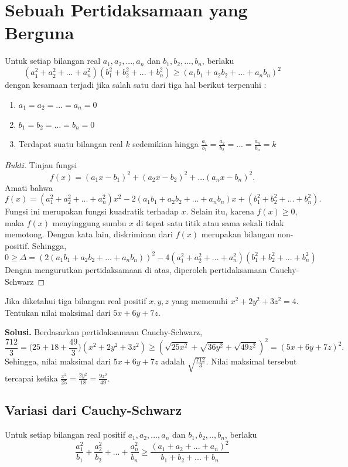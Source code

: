 \documentclass[11pt]{scrartcl}
\begin{document}
\section{Sebuah Pertidaksamaan yang Berguna}
\begin{theorem}
 Untuk setiap bilangan real $a_1,a_2,...,a_n$ dan $b_1,b_2,...,b_n$, berlaku $$(a_1^2 + a_2^2 + ... + a_n^2)(b_1^2 + b_2^2 +... + b_n^2) \geq (a_1b_1 + a_2b_2 + ... + a_nb_n)^2$$ dengan kesamaan terjadi jika salah satu dari tiga hal berikut terpenuhi : 
        \begin{enumerate}
            \item $a_1 = a_2 = ... = a_n = 0$
            \item $b_1 = b_2 = ... = b_n = 0$
            \item Terdapat suatu bilangan real $k$ sedemikian hingga $\frac{a_1}{b_1} = \frac{a_2}{b_2} = ... = \frac{a_n}{b_n} = k$
        \end{enumerate}
\end{theorem}
\begin{proof}[Bukti]
Tinjau fungsi $$f(x) = (a_1x -b_1)^2 + (a_2x - b_2)^2 + ... (a_nx - b_n)^2.$$ Amati bahwa $$f(x) = (a_1^2 + a_2^2 + ... + a_n^2)x^2 - 2(a_1b_1 + a_2b_2 + ... + a_nb_n)x + (b_1^2 + b_2^2 +... +b_n^2).$$ Fungsi ini merupakan fungsi kuadratik terhadap $x$. Selain itu, karena $f(x) \geq 0$, maka $f(x)$ menyinggung sumbu $x$ di tepat satu titik atau sama sekali tidak memotong. Dengan kata lain, diskriminan dari $f(x)$ merupakan bilangan non-positif. Sehingga, $$0 \geq \Delta = (2(a_1b_1 + a_2b_2 + ... + a_nb_n))^2 - 4(a_1^2 + a_2^2 + ... + a_n^2)(b_1^2 + b_2^2 + ... + b_n^2)$$ Dengan mengurutkan pertidaksamaan di atas, diperoleh pertidaksamaan Cauchy-Schwarz
\end{proof}

\begin{example}
Jika diketahui tiga bilangan real positif $x,y,z$ yang memenuhi $x^2 + 2y^2 + 3z^2 = 4$. Tentukan nilai maksimal dari $5x + 6y + 7z$.
\end{example}

\textbf{Solusi.} Berdasarkan pertidaksamaan Cauchy-Schwarz, $$\frac{712}{3} = \Big(25 + 18 + \frac{49}{3}\Big)(x^2 + 2y^2 + 3z^2) \geq (\sqrt{25x^2} + \sqrt{36y^2} + \sqrt{49z^2})^2 = (5x + 6y + 7z)^2.$$ Sehingga, nilai maksimal dari $5x + 6y + 7z$ adalah $\sqrt{\frac{712}{3}}$. Nilai maksimal tersebut tercapai ketika $\frac{x^2}{25} = \frac{2y^2}{18} = \frac{9z^2}{49}$. 

\subsection{Variasi dari Cauchy-Schwarz}
\begin{theorem}
 Untuk setiap bilangan real positif $a_1,a_2,...,a_n$ dan $b_1, b_2,.., b_n$, berlaku $$\frac{a_1^2}{b_1} + \frac{a_2^2}{b_2} + ... + \frac{a_n^2}{b_n} \geq \frac{(a_1 + a_2 + ... + a_n)^2}{b_1 + b_2 + ... + b_n}$$
\end{theorem}    
\end{document}
